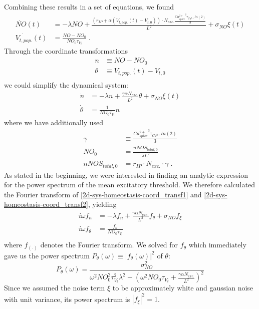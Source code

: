 \documentclass[10pt,a4paper]{article}
\begin{document}
Combining these results in a set of equations, we found
\begin{align}
\dot{NO}(t) &= -\lambda NO + \frac{(r_{IP} + \alpha(V_{t,pop.}(t)-V_{t,0}))\cdot N_{exc.}\frac{{Ca^{2+}_{spike}}^3 \tau_{Ca^{2+}}ln(2)}{3}}{L^2} + \sigma_{NO} \xi(t) \label{2d-sys-homeostasis1}\\
\dot{V_{t,pop.}}(t) &= \frac{NO-NO_0}{NO_0 \tau_{V_t}}\;. \label{2d-sys-homeostasis2}
\end{align}
Through the coordinate transformations
\begin{align}
n &\equiv NO-NO_0 \label{simplif_coord_transf1}\\
\theta &\equiv V_{t,pop.}(t)-V_{t,0} \label{simplif_coord_transf2}\\
\end{align}
we could simplify the dynamical system:
\begin{align}
\dot{n} &= -\lambda n + \frac{\gamma \alpha N_{exc.}}{L^2}\theta + \sigma_{NO} \xi(t) \label{2d-sys-homeostasis-coord_transf1}\\
\dot{\theta} &= \frac{1}{NO_0 \tau_{V_t}} n \label{2d-sys-homeostasis-coord_transf2}
\end{align}
where we have additionally used
\begin{align}
\gamma &\equiv \frac{{Ca^{2+}_{spike}}^3 \tau_{Ca^{2+}}ln(2)}{3} \label{2d-sys-fixed-points1}\\
NO_0 &= \frac{nNOS_{total,0}}{\lambda L^2} \label{2d-sys-fixed-points2}\\
nNOS_{total,0} &= r_{IP}\cdot N_{exc.} \cdot \gamma \; . \label{2d-sys-fixed-points3}
\end{align}
As stated in the beginning, we were interested in finding an analytic expression for the power spectrum of the mean excitatory threshold. We therefore calculated the Fourier transform of \eqref{2d-sys-homeostasis-coord_transf1} and \eqref{2d-sys-homeostasis-coord_transf2}, yielding
\begin{align}
i\omega f_n &= - \lambda f_n + \frac{\gamma \alpha N_{exc.}}{L^2}f_\theta + \sigma_{NO} f_{\xi} \label{2d-sys-homeostasis-coord_transf_ft1}\\
i\omega f_\theta &= \frac{f_n}{NO_0\tau_{V_t}} \label{2d-sys-homeostasis-coord_transf_ft2} \\
\end{align}
where $f_{(\cdot)}$ denotes the Fourier transform. We solved for $f_\theta$ which immediately gave us the power spectrum $P_\theta (\omega) \equiv |f_\theta (\omega)|^2$ of $\theta$:
\begin{equation}
P_\theta (\omega) = \frac{\sigma_{NO}^2}{\omega^2 NO_0^2 \tau_{V_t}^2 \lambda^2 + \left( \omega^2 NO_0 \tau_{V_t} + \frac{\gamma \alpha N_{exc.}}{L^2}\right)^2} \label{Pow_Spec_Theta_Final}
\end{equation}
Since we assumed the noise term $\xi$ to be approximately white and gaussian noise with unit variance, its power spectrum is $|f_{\xi}|^2 = 1$.
\end{document}
